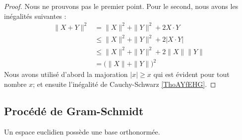 \begin{proof}
	Nous ne prouvons pas le premier point.
    Pour le second, nous avons les inégalités suivantes :
	\begin{subequations}
		\begin{align}
			\| X+Y \|^2&=\| X \|^2+\| Y \|^2+2X\cdot Y\\
			&\leq\| X \|^2+\| Y \|^2+2|X\cdot Y|\\
			&\leq\| X \|^2+\| Y \|^2+2\| X \|\| Y \|\\
			&=\big( \| X \|+\| Y \| \big)^2
		\end{align}
	\end{subequations}
    Nous avons utilisé d'abord la majoration $| x |\geq x$ qui est évident pour tout nombre $x$; et ensuite l'inégalité de Cauchy-Schwarz \ref{ThoAYfEHG}.
\end{proof}

\subsection{Procédé de Gram-Schmidt}

\begin{proposition}    \label{PropUMtEqkb}
    Un espace euclidien possède une base orthonormée.
\end{proposition}

